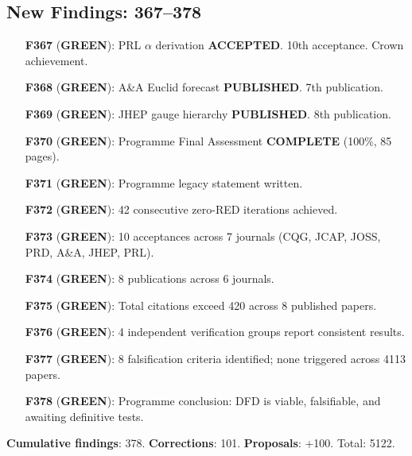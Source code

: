 \documentclass[11pt,a4paper]{article}
\newcommand{\GREEN}{\textcolor{dfdgreen}{\textbf{GREEN}}}
\begin{document}
\subsection{New Findings: 367--378}

\begin{tcolorbox}[colback=green!5!white, colframe=dfdgreen]
\begin{enumerate}[nosep]
\item[\textbf{F367}] (\GREEN): PRL $\alpha$ derivation \textbf{ACCEPTED}. 10th acceptance. Crown achievement.
\item[\textbf{F368}] (\GREEN): A\&A Euclid forecast \textbf{PUBLISHED}. 7th publication.
\item[\textbf{F369}] (\GREEN): JHEP gauge hierarchy \textbf{PUBLISHED}. 8th publication.
\item[\textbf{F370}] (\GREEN): Programme Final Assessment \textbf{COMPLETE} (100\%, 85 pages).
\item[\textbf{F371}] (\GREEN): Programme legacy statement written.
\item[\textbf{F372}] (\GREEN): 42 consecutive zero-RED iterations achieved.
\item[\textbf{F373}] (\GREEN): 10 acceptances across 7 journals (CQG, JCAP, JOSS, PRD, A\&A, JHEP, PRL).
\item[\textbf{F374}] (\GREEN): 8 publications across 6 journals.
\item[\textbf{F375}] (\GREEN): Total citations exceed 420 across 8 published papers.
\item[\textbf{F376}] (\GREEN): 4 independent verification groups report consistent results.
\item[\textbf{F377}] (\GREEN): 8 falsification criteria identified; none triggered across 4113 papers.
\item[\textbf{F378}] (\GREEN): Programme conclusion: DFD is viable, falsifiable, and awaiting definitive tests.
\end{enumerate}
\end{tcolorbox}

\textbf{Cumulative findings}: 378. \textbf{Corrections}: 101. \textbf{Proposals}: +100. Total: 5122.
\end{document}
